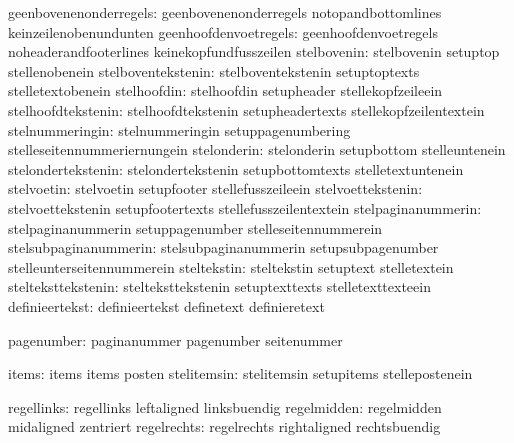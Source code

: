        geenbovenenonderregels:  geenbovenenonderregels       notopandbottomlines
                                keinzeilenobenundunten
        geenhoofdenvoetregels:  geenhoofdenvoetregels        noheaderandfooterlines
                                keinekopfundfusszeilen
                  stelbovenin:  stelbovenin                  setuptop
                                stellenobenein
           stelboventekstenin:  stelboventekstenin           setuptoptexts
                                stelletextobenein
                  stelhoofdin:  stelhoofdin                  setupheader
                                stellekopfzeileein
           stelhoofdtekstenin:  stelhoofdtekstenin           setupheadertexts
                                stellekopfzeilentextein
              stelnummeringin:  stelnummeringin              setuppagenumbering
                                stelleseitennummeriernungein
                  stelonderin:  stelonderin                  setupbottom
                                stelleuntenein
           stelondertekstenin:  stelondertekstenin           setupbottomtexts
                                stelletextuntenein
                   stelvoetin:  stelvoetin                   setupfooter
                                stellefusszeileein
            stelvoettekstenin:  stelvoettekstenin            setupfootertexts
                                stellefusszeilentextein
           stelpaginanummerin:  stelpaginanummerin           setuppagenumber
                                stelleseitennummerein
        stelsubpaginanummerin:  stelsubpaginanummerin        setupsubpagenumber
                                stelleunterseitennummerein
                  steltekstin:  steltekstin                  setuptext
                                stelletextein
           stelteksttekstenin:  stelteksttekstenin           setuptexttexts
                                stelletexttexteein
               definieertekst:  definieertekst               definetext
                                definieretext

                   pagenumber:  paginanummer                 pagenumber
                                seitenummer

                        items:  items                        items
                                posten
                  stelitemsin:  stelitemsin                  setupitems
                                stellepostenein

                   regellinks:  regellinks                   leftaligned
                                linksbuendig
                  regelmidden:  regelmidden                  midaligned
                                zentriert
                  regelrechts:  regelrechts                  rightaligned
                                rechtsbuendig

